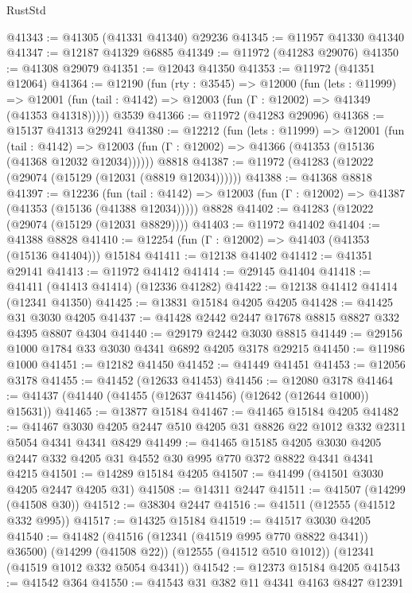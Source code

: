 \begin{lexlean}{RustStd}
\begin{coremodule}
@41343 := @41305 (@41331 @41340) @29236
@41345 := @11957 @41330 @41340
@41347 := @12187 @41329 @6885
@41349 := @11972 (@41283 @29076)
@41350 := @41308 @29079
@41351 := @12043 @41350
@41353 := @11972 (@41351 @12064)
@41364 := @12190
    (fun (rty : @3545) =>
    @12000
      (fun (lets : @11999) =>
      @12001 (fun (tail : @4142) => @12003 (fun (Γ : @12002) => @41349 (@41353 @41318)))))
    @3539
@41366 := @11972 (@41283 @29096)
@41368 := @15137 @41313 @29241
@41380 := @12212
    (fun (lets : @11999) =>
    @12001
      (fun (tail : @4142) =>
      @12003 (fun (Γ : @12002) => @41366 (@41353 (@15136 (@41368 @12032 @12034))))))
    @8818
@41387 := @11972 (@41283 (@12022 (@29074 (@15129 (@12031 (@8819 @12034))))))
@41388 := @41368 @8818
@41397 := @12236
    (fun (tail : @4142) => @12003 (fun (Γ : @12002) => @41387 (@41353 (@15136 (@41388 @12034)))))
    @8828
@41402 := @41283 (@12022 (@29074 (@15129 (@12031 @8829))))
@41403 := @11972 @41402
@41404 := @41388 @8828
@41410 := @12254 (fun (Γ : @12002) => @41403 (@41353 (@15136 @41404))) @15184
@41411 := @12138 @41402
@41412 := @41351 @29141
@41413 := @11972 @41412
@41414 := @29145 @41404
@41418 := @41411 (@41413 @41414) (@12336 @41282)
@41422 := @12138 @41412 @41414 (@12341 @41350)
@41425 := @13831 @15184 @4205 @4205
@41428 := @41425 @31 @3030 @4205
@41437 := @41428 @2442 @2447 @17678 @8815 @8827 @332 @4395 @8807 @4304
@41440 := @29179 @2442 @3030 @8815
@41449 := @29156 @1000 @1784 @33 @3030 @4341 @6892 @4205 @3178 @29215
@41450 := @11986 @1000
@41451 := @12182 @41450
@41452 := @41449 @41451
@41453 := @12056 @3178
@41455 := @41452 (@12633 @41453)
@41456 := @12080 @3178
@41464 := @41437 (@41440 (@41455 (@12637 @41456) (@12642 (@12644 @1000)) @15631))
@41465 := @13877 @15184
@41467 := @41465 @15184 @4205
@41482 := @41467 @3030 @4205 @2447 @510 @4205 @31 @8826 @22 @1012 @332 @2311 @5054 @4341 @4341 @8429
@41499 := @41465
    @15185
    @4205
    @3030
    @4205
    @2447
    @332
    @4205
    @31
    @4552
    @30
    @995
    @770
    @372
    @8822
    @4341
    @4341
    @4215
@41501 := @14289 @15184 @4205
@41507 := @41499 (@41501 @3030 @4205 @2447 @4205 @31)
@41508 := @14311 @2447
@41511 := @41507 (@14299 (@41508 @30))
@41512 := @38304 @2447
@41516 := @41511 (@12555 (@41512 @332 @995))
@41517 := @14325 @15184
@41519 := @41517 @3030 @4205
@41540 := @41482
    (@41516 (@12341 (@41519 @995 @770 @8822 @4341)) @36500)
    (@14299 (@41508 @22))
    (@12555 (@41512 @510 @1012))
    (@12341 (@41519 @1012 @332 @5054 @4341))
@41542 := @12373 @15184 @4205
@41543 := @41542 @364
@41550 := @41543 @31 @382 @11 @4341 @4163 @8427 @12391

\end{coremodule}
\end{lexlean}
